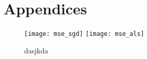 \documentclass[11pt]{article}
\begin{document}
\newpage

\section{Appendices}
	\lipsum[1]

	\begin{figure}[!ht]
		\centering		
		\texttt{[image: mse\_sgd]}
		\texttt{[image: mse\_als]}
		\caption{dasjkda}
		\label{5}		
	\end{figure}
\end{document}
